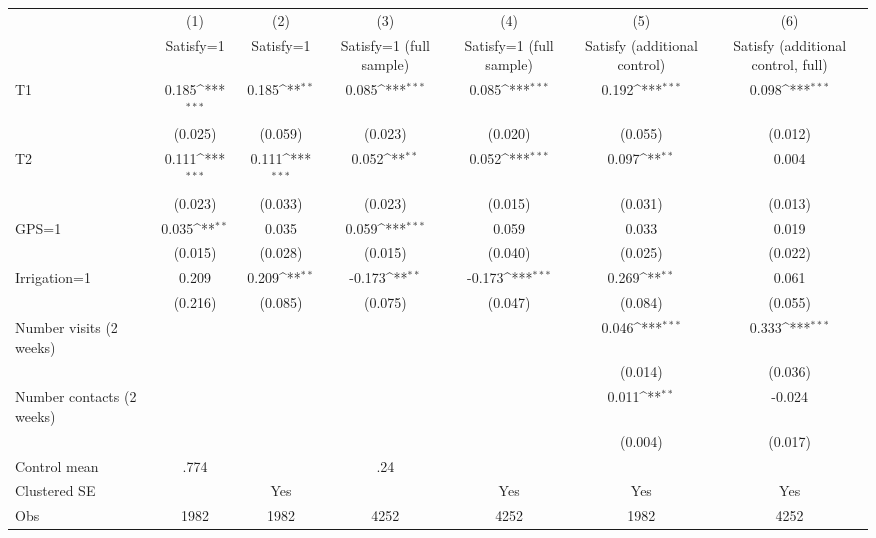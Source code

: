 {
\def\sym#1{\ifmmode^{#1}\else\(^{#1}\)\fi}
\begin{tabular}{l*{6}{c}}
\hline\hline
                    &\multicolumn{1}{c}{(1)}         &\multicolumn{1}{c}{(2)}         &\multicolumn{1}{c}{(3)}         &\multicolumn{1}{c}{(4)}         &\multicolumn{1}{c}{(5)}         &\multicolumn{1}{c}{(6)}         \\
                    &Satisfy=1         &Satisfy=1         &Satisfy=1 (full sample)         &Satisfy=1 (full sample)         &Satisfy (additional control)         &Satisfy (additional control, full)         \\
\hline
T1                  &0.185\sym{***}&0.185\sym{**} &0.085\sym{***}&0.085\sym{***}&0.192\sym{***}&0.098\sym{***}\\
                    &(0.025)         &(0.059)         &(0.023)         &(0.020)         &(0.055)         &(0.012)         \\
T2                  &0.111\sym{***}&0.111\sym{***}&0.052\sym{**} &0.052\sym{***}&0.097\sym{**} &0.004         \\
                    &(0.023)         &(0.033)         &(0.023)         &(0.015)         &(0.031)         &(0.013)         \\
GPS=1               &0.035\sym{**} &0.035         &0.059\sym{***}&0.059         &0.033         &0.019         \\
                    &(0.015)         &(0.028)         &(0.015)         &(0.040)         &(0.025)         &(0.022)         \\
Irrigation=1        &0.209         &0.209\sym{**} &-0.173\sym{**} &-0.173\sym{***}&0.269\sym{**} &0.061         \\
                    &(0.216)         &(0.085)         &(0.075)         &(0.047)         &(0.084)         &(0.055)         \\
Number visits (2 weeks)&              &              &              &              &0.046\sym{***}&0.333\sym{***}\\
                    &              &              &              &              &(0.014)         &(0.036)         \\
Number contacts (2 weeks)&              &              &              &              &0.011\sym{**} &-0.024         \\
                    &              &              &              &              &(0.004)         &(0.017)         \\
\hline
Control mean        & .774         &              &  .24         &              &              &              \\
Clustered SE        &              &  Yes         &              &  Yes         &  Yes         &  Yes         \\
Obs                 & 1982         & 1982         & 4252         & 4252         & 1982         & 4252         \\
\hline\hline
\end{tabular}
}
